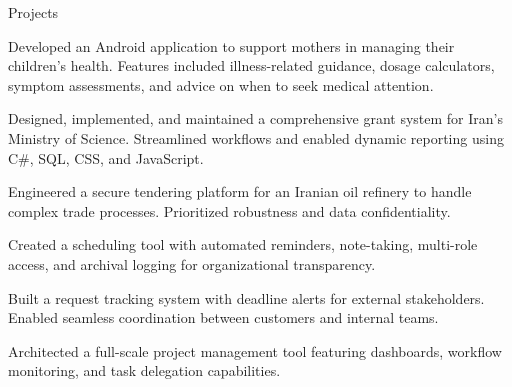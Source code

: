 \begin{rubric}{Projects}

  Developed an Android application to support mothers in managing their children's health. Features included illness-related guidance, dosage calculators, symptom assessments, and advice on when to seek medical attention.

  Designed, implemented, and maintained a comprehensive grant system for Iran’s Ministry of Science. Streamlined workflows and enabled dynamic reporting using C\#, SQL, CSS, and JavaScript.

  Engineered a secure tendering platform for an Iranian oil refinery to handle complex trade processes. Prioritized robustness and data confidentiality.

  Created a scheduling tool with automated reminders, note-taking, multi-role access, and archival logging for organizational transparency.

  Built a request tracking system with deadline alerts for external stakeholders. Enabled seamless coordination between customers and internal teams.

  Architected a full-scale project management tool featuring dashboards, workflow monitoring, and task delegation capabilities.

\end{rubric}